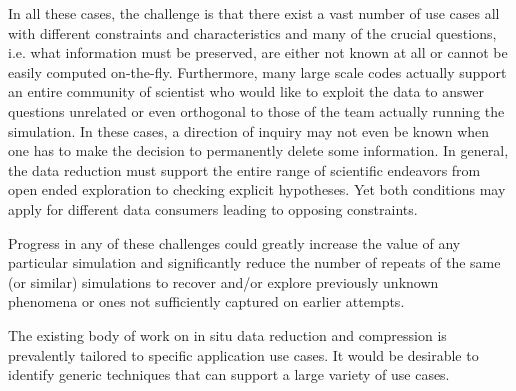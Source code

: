 \begin{refsection}
In all these cases, the challenge is that there exist a vast number of use cases all with different constraints and characteristics and many of the crucial questions, i.e. what information must be preserved, are either not known at all or cannot be easily computed on-the-fly. Furthermore, many large scale codes actually support an entire community of scientist who would like to exploit the data to answer questions unrelated or even orthogonal to those of the team actually running the simulation. In these cases, a direction of inquiry may not even be known when one has to make the decision to permanently delete some information. In general, the data reduction must support the entire range of scientific endeavors from open ended exploration to checking explicit hypotheses. Yet both conditions may apply for different data consumers leading to opposing constraints.

Progress in any of these challenges could greatly increase the value of any particular simulation and significantly reduce the number of repeats of the same (or similar) simulations to recover and/or explore previously unknown phenomena or ones not sufficiently captured on earlier attempts.

The existing body of work on in situ data reduction and compression is prevalently tailored to specific application use cases. It would be desirable to identify generic techniques that can support a large variety of use cases.



\printbibliography[heading=bibliography]
\end{refsection}

